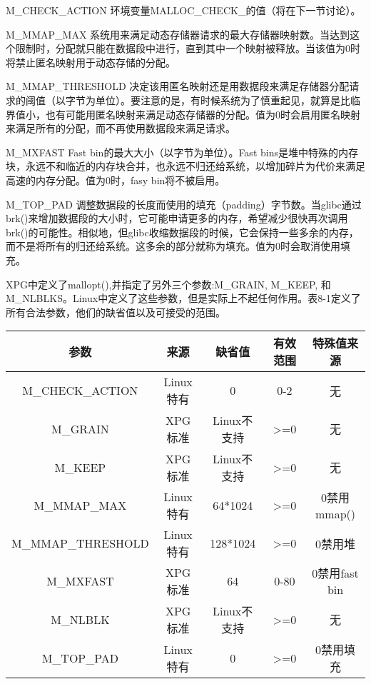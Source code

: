 \begin{eqlist*}
\item[M\_CHECK\_ACTION]环境变量MALLOC\_CHECK\_的值（将在下一节讨论）。 
\item[M\_MMAP\_MAX]系统用来满足动态存储器请求的最大存储器映射数。当达到这个限制时，分配就只能在数据段中进行，直到其中一个映射被释放。当该值为0时将禁止匿名映射用于动态存储的分配。 
\item[M\_MMAP\_THRESHOLD]决定该用匿名映射还是用数据段来满足存储器分配请求的阈值（以字节为单位）。要注意的是，有时候系统为了慎重起见，就算是比临界值小，也有可能用匿名映射来满足动态存储器的分配。值为0时会启用匿名映射来满足所有的分配，而不再使用数据段来满足请求。 
\item[M\_MXFAST]Fast bin的最大大小（以字节为单位）。Fast bins是堆中特殊的内存块，永远不和临近的内存块合并，也永远不归还给系统，以增加碎片为代价来满足高速的内存分配。值为0时，fasy bin将不被启用。 
\item[M\_TOP\_PAD]调整数据段的长度而使用的填充（padding）字节数。当glibc通过brk()来增加数据段的大小时，它可能申请更多的内存，希望减少很快再次调用brk()的可能性。相似地，但glibc收缩数据段的时候，它会保持一些多余的内存，而不是将所有的归还给系统。这多余的部分就称为填充。值为0时会取消使用填充。 
\end{eqlist*}

XPG中定义了mallopt(),并指定了另外三个参数:M\_GRAIN, M\_KEEP, 和M\_NLBLKS。Linux中定义了这些参数，但是实际上不起任何作用。表8-1定义了所有合法参数，他们的缺省值以及可接受的范围。 

\begin{center}
\begin{tabular}{ccccc}
  \toprule [1pt]
  \rowcolor[gray]{.9}
    参数 & 来源 & 缺省值 & 有效范围 & 特殊值来源 \\
  \midrule
    M\_CHECK\_ACTION & Linux特有 & 0 & 0-2 & 无 \\
	M\_GRAIN & XPG标准 & Linux不支持 & >=0 & 无 \\
	M\_KEEP & XPG标准 & Linux不支持 & >=0 & 无 \\
	M\_MMAP\_MAX & Linux特有 & 64*1024 & >=0 & 0禁用mmap() \\
	M\_MMAP\_THRESHOLD & Linux特有 & 128*1024 & >=0 & 0禁用堆 \\
	M\_MXFAST & XPG标准 & 64 & 0-80 & 0禁用fast bin \\
	M\_NLBLK & XPG标准 & Linux不支持 & >=0 & 无 \\
	M\_TOP\_PAD & Linux特有 & 0 & >=0 & 0禁用填充 \\
  \bottomrule[1pt]
\end{tabular}
\end{center}

